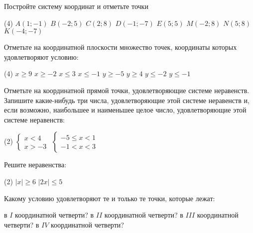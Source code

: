 \begin{homework}[number=2]
	\begin{listofex}
		\item Постройте систему координат и отметьте точки
		\begin{tasks}(4)
			\task \( A(1;-1) \)
			\task \( B(-2;5) \)
			\task \( C(2;8) \)
			\task \( D(-1;-7) \)
			\task \( E(5;5) \)
			\task \( M(-2;8) \)
			\task \( N(5;8) \)
			\task \( K(-4;-7) \)
		\end{tasks}
		\item Отметьте на координатной плоскости множество точек, координаты которых удовлетворяют условию:
		\begin{tasks}(4)
			\task \( x \ge 9 \)
			\task \( x \ge -2 \)
			\task \( x \le 3 \)
			\task \( x \le -1 \)
			\task \( y \ge -5 \)
			\task \( y \ge 4 \)
			\task \( y \le -2 \)
			\task \( y \le -1 \)
		\end{tasks}
		\item Отметьте на координатной прямой точки, удовлетворяющие системе неравенств. Запишите какие-нибудь три числа, удовлетворяющие этой системе неравенств и, если возможно, наибольшее и наименьшее целое число, удовлетворяющие этой системе неравенств:
		\begin{tasks}(2)
			\task \( \begin{cases} x<4 \\ x>-3 \end{cases} \)
			\task \( \begin{cases} -5 \le x < 1 \\ -1 < x < 3 \end{cases} \)
		\end{tasks}
		\item Решите неравенства:
		\begin{tasks}(2)
			\task \( |x| \ge 6 \)
			\task \( |2x| \le 5 \)
		\end{tasks}
	\end{listofex}
\end{homework}

\begin{class}[number=5]
	\begin{listofex}
		\item Какому условию удовлетворяют те и только те точки, которые лежат:
		\begin{tasks}
			\task в \( I \) координатной четверти?
			\task в \( II \) координатной четверти?
			\task в \( III \) координатной четверти?
			\task в \( IV \) координатной четверти?
		\end{tasks}
	\end{listofex}
\end{class}

